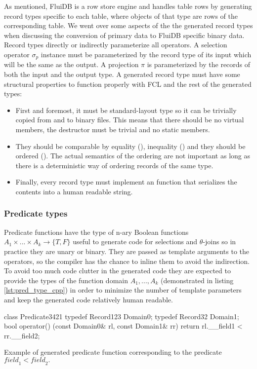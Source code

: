 As mentioned, FluiDB is a row store engine and handles table rows by
generating record types specific to each table, where objects of that
type are rows of the corresponding table. We went over some aspects of
the the generated record types when discussing the conversion of
primary data to FluiDB specific binary data. Record types directly or
indirectly parameterize all operators. A selection operator
\(\sigma_p\) instance must be parameterized by the record type of its
input which will be the same as the output. A projection \(\pi\) is
parameterized by the records of both the input and the output type. A
generated record type must have some structural properties to function
properly with FCL and the rest of the generated types:

\begin{itemize}
\item First and foremost, it must be standard-layout type so it can be
trivially copied from and to binary files. This means that there
should be no virtual members, the destructor must be trivial and no
static members.
\item They should be comparable by equality (\cpp{==}), inequality (\cpp{!=}) and
they should be ordered (\cpp{<}). The actual semantics of the ordering
are not important as long as there is a deterministic way of
ordering records of the same type.
\item Finally, every record type must implement an  function that serializes the contents into a human readable
string.
\end{itemize}

\subsubsection{Predicate types}

Predicate functions have the type of n-ary Boolean functions \(A_1
\times ... \times A_k \to \{T,F\}\) useful to generate code for
selections and \(\theta\)-joins so in practice they are unary or
binary. They are passed as template arguments to the operators, so the
compiler has the chance to inline them to avoid the indirection. To
avoid too much code clutter in the generated code they are expected to
provide the types of the function domain \(A_1, ..., A_k\)
(demonstrated in listing \ref{lst:pred_type_cpp}) in order to minimize
the number of template parameters and keep the generated code
relatively human readable.

\begin{code}
  \begin{cppcode}
  class Predicate3421 {
    typedef Record123 Domain0;
    typedef Record32 Domain1;
    bool operator() (const Domain0& rl, const Domain1& rr) {
      return rl.__field1 < rr.__field2;
    }
  }
  \end{cppcode}
  \caption{\label{lst:pred_type_cpp}Example of generated predicate function corresponding to the predicate \(\mathit{field}_1 < \mathit{field}_2.\)}
\end{code}

